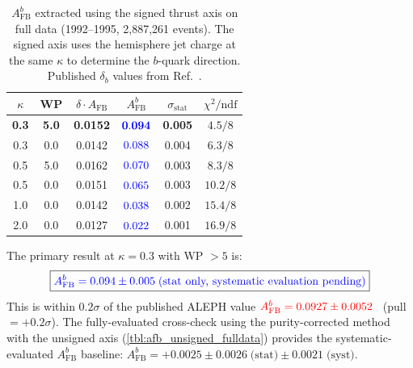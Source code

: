 \documentclass[11pt,a4paper]{article}
\newcommand{\measured}[1]{\textcolor{blue}{#1}}
\newcommand{\external}[1]{\textcolor{red}{#1}}
\begin{document}
\begin{table}[htbp]
\centering
\caption{$A_\text{FB}^b$ extracted using the signed thrust axis
on full data (1992--1995, 2,887,261 events).
The signed axis uses the hemisphere jet charge at the same
$\kappa$ to determine the $b$-quark direction.
Published $\delta_b$ values from Ref.~\cite{LEP:EWWG:2005}.}
\label{tbl:afb_signed_fulldata}
\begin{tabular}{cccccc}
\toprule
$\kappa$ & WP & $\delta \cdot A_\text{FB}$ &
$A_\text{FB}^b$ & $\sigma_\text{stat}$ & $\chi^2/\text{ndf}$ \\
\midrule
\textbf{0.3} & \textbf{5.0} & \textbf{0.0152} &
  $\measured{\mathbf{0.094}}$ & \textbf{0.005} & $4.5/8$ \\
0.3 & 0.0 & 0.0142 & $\measured{0.088}$ & 0.004 & $6.3/8$ \\
0.5 & 5.0 & 0.0162 & $\measured{0.070}$ & 0.003 & $8.3/8$ \\
0.5 & 0.0 & 0.0151 & $\measured{0.065}$ & 0.003 & $10.2/8$ \\
1.0 & 0.0 & 0.0142 & $\measured{0.038}$ & 0.002 & $15.4/8$ \\
2.0 & 0.0 & 0.0127 & $\measured{0.022}$ & 0.001 & $16.9/8$ \\
\bottomrule
\end{tabular}
\end{table}

The primary result at $\kappa = 0.3$ with WP $> 5$ is:
\begin{equation}
\boxed{
\measured{A_\text{FB}^b = 0.094 \pm 0.005\;\text{(stat only, systematic evaluation pending)}}
}
\label{eq:afb_signed_fulldata}
\end{equation}
This is within $0.2\sigma$ of the published ALEPH value
$\external{A_\text{FB}^b = 0.0927 \pm 0.0052}$~\cite{ALEPH:AFBb}
(pull $= +0.2\sigma$).
The fully-evaluated cross-check using the purity-corrected method
with the unsigned axis (\cref{tbl:afb_unsigned_fulldata}) provides
the systematic-evaluated $A_\text{FB}^b$ baseline:
$A_\text{FB}^b = +0.0025 \pm 0.0026\;\text{(stat)} \pm 0.0021\;\text{(syst)}$.
\end{document}

